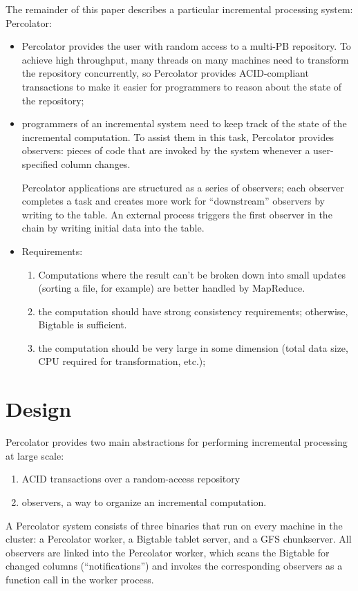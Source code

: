 \documentclass[11pt]{article}
\begin{document}
The remainder of this paper describes a particular incremental processing system: Percolator:
\begin{itemize}
\item Percolator provides the user with random access to a multi-PB repository. To achieve high
throughput, many threads on many machines need to transform the repository concurrently, so
Percolator provides ACID-compliant transactions to make it easier for programmers to reason about the state of the repository;
\item programmers of an incremental system need to keep track of the state of the incremental computation.
To assist them in this task, Percolator provides observers: pieces of code that are invoked by the
system whenever a user-specified column changes.

Percolator applications are structured as a series of observers; each observer completes a task and
creates more work for ``downstream'' observers by writing to the table. An external process triggers
the first observer in the chain by writing initial data into the table.
\item Requirements:
\begin{enumerate}
\item Computations where the result can’t be broken down into small updates (sorting a file, for example) are better handled by MapReduce.
\item the computation should have strong consistency requirements; otherwise, Bigtable is sufficient.
\item the computation should be very large in some dimension (total data size, CPU required for
transformation, etc.);
\end{enumerate}
\end{itemize}
\section{Design}
\label{sec:orga8a5c6c}
Percolator provides two main abstractions for performing incremental processing at large scale:
\begin{enumerate}
\item ACID transactions over a random-access repository
\item observers, a way to organize an incremental computation.
\end{enumerate}

A Percolator system consists of three binaries that run on every machine in the cluster: a Percolator
worker, a Bigtable tablet server, and a GFS chunkserver. All observers are linked into the Percolator
worker, which scans the Bigtable for changed columns (“notifications”) and invokes the corresponding
observers as a function call in the worker process.
\end{document}
